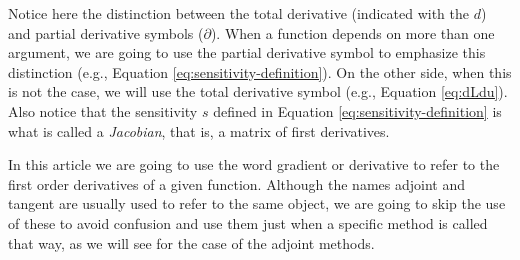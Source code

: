 Notice here the distinction between the total derivative (indicated with the $d$) and partial derivative symbols ($\partial$). 
When a function depends on more than one argument, we are going to use the partial derivative symbol to emphasize this distinction (e.g., Equation \eqref{eq:sensitivity-definition}). 
On the other side, when this is not the case, we will use the total derivative symbol (e.g., Equation \eqref{eq:dLdu}).
Also notice that the sensitivity $s$ defined in Equation \eqref{eq:sensitivity-definition} is what is called a \textit{Jacobian}, that is, a matrix of first derivatives.

In this article we are going to use the word gradient or derivative to refer to the first order derivatives of a given function. 
Although the names adjoint and tangent are usually used to refer to the same object, we are going to skip the use of these to avoid confusion and use them just when a specific method is called that way, as we will see for the case of the adjoint methods. 